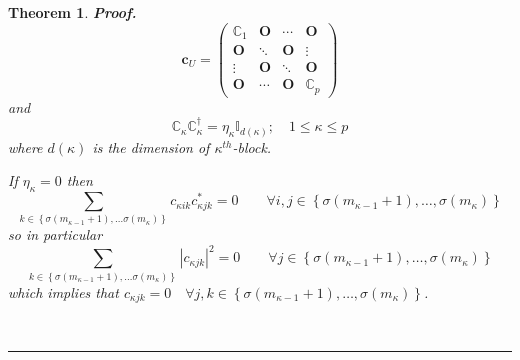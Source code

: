 \documentclass[aps,preprint]{revtex4}
\newtheorem{theorem}{Theorem}
\newenvironment{proof}[1][Proof]{\noindent\textbf{#1.} }{\ \rule{0.5em}{0.5em}}
\begin{document}
\begin{theorem}
\begin{proof}
\begin{equation}
\mathbf{c}_{U}=\left( 
\begin{array}{cccc}
\mathbb{C}_{1} & \mathbf{O} & \cdots & \mathbf{O} \\ 
\mathbf{O} & \ddots & \mathbf{O} & \vdots \\ 
\vdots & \mathbf{O} & \ddots & \mathbf{O} \\ 
\mathbf{O} & \cdots & \mathbf{O} & \mathbb{C}_{p}%
\end{array}%
\right)
\end{equation}%
and 
\begin{equation}
\mathbb{C}_{\kappa }\mathbb{C}_{\kappa }^{\dagger }=\eta _{\kappa }\mathbb{I}%
_{d\left( \kappa \right) };\quad 1\leq \kappa \leq p
\end{equation}%
where $d\left( \kappa \right) $ is the dimension of $\kappa ^{th}$-block.

If $\eta _{\kappa }=0$ then 
\begin{equation}
\sum_{k\in \left\{ \sigma \left( m_{\kappa -1}+1\right) ,\ldots \sigma
\left( m_{\kappa }\right) \right\} }c_{\kappa ik}c_{\kappa jk}^{\ast
}=0\qquad \forall i,j\in \left\{ \sigma \left( m_{\kappa -1}+1\right)
,\ldots ,\sigma \left( m_{\kappa }\right) \right\}
\end{equation}%
so in particular 
\begin{equation}
\sum_{k\in \left\{ \sigma \left( m_{\kappa -1}+1\right) ,\ldots \sigma
\left( m_{\kappa }\right) \right\} }\left| c_{\kappa jk}\right| ^{2}=0\qquad
\forall j\in \left\{ \sigma \left( m_{\kappa -1}+1\right) ,\ldots ,\sigma
\left( m_{\kappa }\right) \right\}
\end{equation}%
which implies that $c_{\kappa jk}=0\quad \forall j,k\in \left\{ \sigma
\left( m_{\kappa -1}+1\right) ,\ldots ,\sigma \left( m_{\kappa }\right)
\right\} $.


\end{proof}
\end{theorem}
\end{document}

